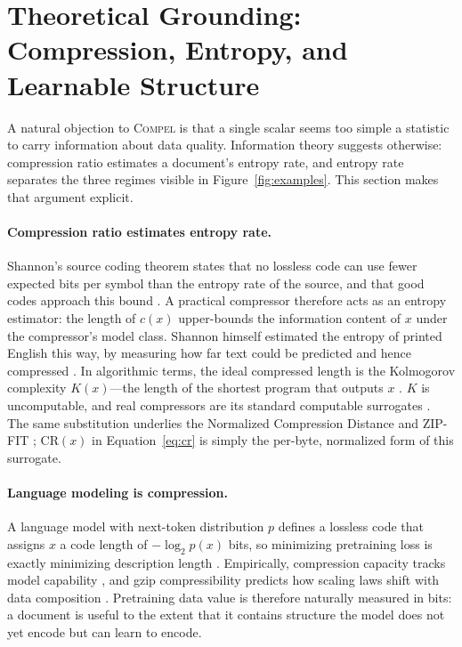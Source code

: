 \section{Theoretical Grounding: Compression, Entropy, and Learnable Structure}\label{sec:theory}

A natural objection to \textsc{Compel} is that a single scalar seems too simple a statistic to carry information about data quality.
Information theory suggests otherwise: compression ratio estimates a document's entropy rate, and entropy rate separates the three regimes visible in Figure~\ref{fig:examples}.
This section makes that argument explicit.

\paragraph{Compression ratio estimates entropy rate.}
Shannon's source coding theorem states that no lossless code can use fewer expected bits per symbol than the entropy rate of the source, and that good codes approach this bound \citep{shannon1948mathematical}.
A practical compressor therefore acts as an entropy estimator: the length of $c(x)$ upper-bounds the information content of $x$ under the compressor's model class.
Shannon himself estimated the entropy of printed English this way, by measuring how far text could be predicted and hence compressed \citep{shannon1951prediction}.
In algorithmic terms, the ideal compressed length is the Kolmogorov complexity $K(x)$---the length of the shortest program that outputs $x$ \citep{kolmogorov1965three}.
$K$ is uncomputable, and real compressors are its standard computable surrogates \citep{li2008introduction}.
The same substitution underlies the Normalized Compression Distance \citep{cilibrasi2005clustering} and ZIP-FIT \citep{obbad2024zipfit}; $\mathrm{CR}(x)$ in Equation~\eqref{eq:cr} is simply the per-byte, normalized form of this surrogate.

\paragraph{Language modeling is compression.}
A language model with next-token distribution $p$ defines a lossless code that assigns $x$ a code length of $-\log_2 p(x)$ bits, so minimizing pretraining loss is exactly minimizing description length \citep{deletang2023language}.
Empirically, compression capacity tracks model capability \citep{huang2024compression}, and gzip compressibility predicts how scaling laws shift with data composition \citep{pandey2024gzip}.
Pretraining data value is therefore naturally measured in bits: a document is useful to the extent that it contains structure the model does not yet encode but can learn to encode.

